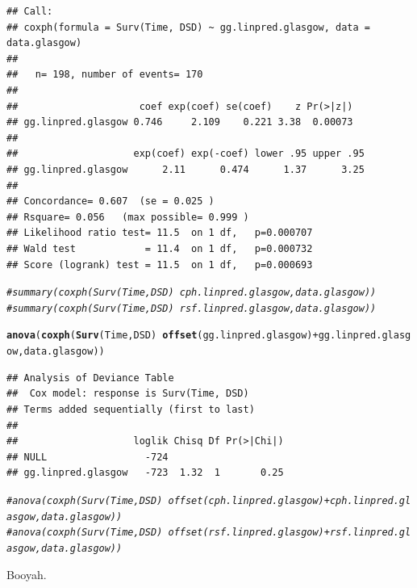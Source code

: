 \documentclass{article}\usepackage[]{graphicx}\usepackage[]{color}
\makeatletter
\newcommand{\hlcom}[1]{\textcolor[rgb]{0.678,0.584,0.686}{\textit{#1}}}%
\newcommand{\hlopt}[1]{\textcolor[rgb]{0,0,0}{#1}}%
\newcommand{\hlstd}[1]{\textcolor[rgb]{0.345,0.345,0.345}{#1}}%
\newcommand{\hlkwd}[1]{\textcolor[rgb]{0.737,0.353,0.396}{\textbf{#1}}}%
\newenvironment{kframe}{%
 \def\at@end@of@kframe{}%
 \ifinner\ifhmode%
  \def\at@end@of@kframe{\end{minipage}}%
  \begin{minipage}{\columnwidth}%
 \fi\fi%
 \def\FrameCommand##1{\hskip\@totalleftmargin \hskip-\fboxsep
 \colorbox{shadecolor}{##1}\hskip-\fboxsep
     \hskip-\linewidth \hskip-\@totalleftmargin \hskip\columnwidth}%
 \MakeFramed {\advance\hsize-\width
   \@totalleftmargin\z@ \linewidth\hsize
   \@setminipage}}%
 {\par\unskip\endMakeFramed%
 \at@end@of@kframe}
\newenvironment{knitrout}{}{} %
\makeatother
\begin{document}
\begin{knitrout}
\begin{kframe}
\begin{alltt}
\end{alltt}
\begin{verbatim}
## Call:
## coxph(formula = Surv(Time, DSD) ~ gg.linpred.glasgow, data = data.glasgow)
## 
##   n= 198, number of events= 170 
## 
##                     coef exp(coef) se(coef)    z Pr(>|z|)
## gg.linpred.glasgow 0.746     2.109    0.221 3.38  0.00073
## 
##                    exp(coef) exp(-coef) lower .95 upper .95
## gg.linpred.glasgow      2.11      0.474      1.37      3.25
## 
## Concordance= 0.607  (se = 0.025 )
## Rsquare= 0.056   (max possible= 0.999 )
## Likelihood ratio test= 11.5  on 1 df,   p=0.000707
## Wald test            = 11.4  on 1 df,   p=0.000732
## Score (logrank) test = 11.5  on 1 df,   p=0.000693
\end{verbatim}
\begin{alltt}
\hlcom{# summary(coxph(Surv(Time, DSD) ~ cph.linpred.glasgow, data.glasgow))}
\hlcom{# summary(coxph(Surv(Time, DSD) ~ rsf.linpred.glasgow, data.glasgow))}

\hlkwd{anova}\hlstd{(}\hlkwd{coxph}\hlstd{(}\hlkwd{Surv}\hlstd{(Time, DSD)} \hlopt{~} \hlkwd{offset}\hlstd{(gg.linpred.glasgow)} \hlopt{+} \hlstd{gg.linpred.glasgow, data.glasgow))}
\end{alltt}
\begin{verbatim}
## Analysis of Deviance Table
##  Cox model: response is Surv(Time, DSD)
## Terms added sequentially (first to last)
## 
##                    loglik Chisq Df Pr(>|Chi|)
## NULL                 -724                    
## gg.linpred.glasgow   -723  1.32  1       0.25
\end{verbatim}
\begin{alltt}
\hlcom{# anova(coxph(Surv(Time, DSD) ~ offset(cph.linpred.glasgow) + cph.linpred.glasgow, data.glasgow))}
\hlcom{# anova(coxph(Surv(Time, DSD) ~ offset(rsf.linpred.glasgow) + rsf.linpred.glasgow, data.glasgow))}
\end{alltt}
\end{kframe}
\end{knitrout}
Booyah.
\end{document}
